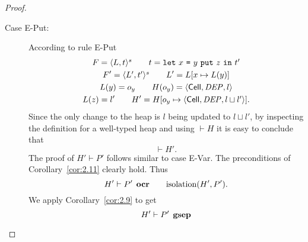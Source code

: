 \begin{proof}
\begin{description}
\begin{description}
\begin{description}
            \item[Case {\sc E-Put}:] According to rule {\sc E-Put}
              \begin{equation}
                \begin{gathered}
                  F = \mbox{$\langle L, t \rangle^s$} \quad\quad t = \mbox{\mdseries\texttt{let}~$x$~\texttt{=}~$\mbox{\mdseries$y$~\texttt{put}~$z$}$~\texttt{in}~$t'$} \\
                  F' = \mbox{$\langle L', t' \rangle^s$} \quad\quad L' = L[x \mapsto L(y)] \\
                  L(y) = o_y \quad\quad H(o_y) = \mbox{$\langle \mbox{$\mathsf{Cell}$}{}, \mathit{DEP}, l \rangle$} \\
                  L(z) = l' \quad\quad H' = H[o_y \mapsto \mbox{$\langle \mbox{$\mathsf{Cell}$}{}, \mathit{DEP}, l \sqcup
                  l' \rangle$}].
                \end{gathered}
              \end{equation}
              Since the only change to the heap is $l$ being updated to $l
              \sqcup l'$, by inspecting the definition for a well-typed heap and
              using $\vdash H$ it is easy to conclude that
              \begin{equation}
                \vdash H'.
              \end{equation}
              The proof of $H' \vdash P'$ follows similar to case {\sc E-Var}.
              The preconditions of Corollary~\ref{cor:2.11} clearly hold. Thus 
              \begin{equation}
                H' \vdash P' \:\: \mbox{\bf ocr} \quad\quad \mbox{$\mathrm{isolation}$}(H', P').
              \end{equation}
              We apply Corollary~\ref{cor:2.9} to get
              \begin{equation}
                H' \vdash P' \:\: \mbox{\bf gsep}
              \end{equation}


\end{description}
\end{description}
\end{description}
\end{proof}
